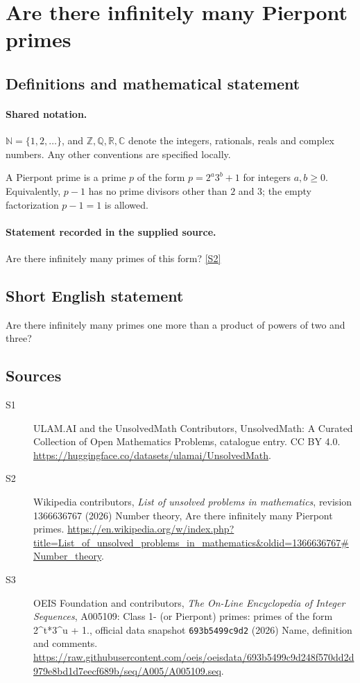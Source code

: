\documentclass[11pt]{article}
\newcommand{\sref}[2]{\hyperlink{source:#1:#2}{[S#2]}}
\begin{document}
\section{Are there infinitely many Pierpont primes}\label{statement}

\subsection{Definitions and mathematical statement}

\paragraph{Shared notation.}$\mathbb N=\{1,2,\ldots\}$, and $\mathbb Z,\mathbb Q,\mathbb R,\mathbb C$ denote the integers, rationals, reals and complex numbers. Any other conventions are specified locally.


A Pierpont prime is a prime $p$ of the form $p=2^a3^b+1$ for integers $a,b\ge0$. Equivalently, $p-1$ has no prime divisors other than $2$ and $3$; the empty factorization $p-1=1$ is allowed.
\paragraph{Statement recorded in the supplied source.}
Are there infinitely many primes of this form? \sref{statement}{2}
\subsection{Short English statement}
Are there infinitely many primes one more than a product of powers of two and three?
\subsection{Sources}
\begin{description}
\item[\hypertarget{source:statement:1}{S1}] ULAM.AI and the UnsolvedMath Contributors, UnsolvedMath: A Curated Collection of Open Mathematics Problems, catalogue entry. CC BY 4.0. \url{https://huggingface.co/datasets/ulamai/UnsolvedMath}.
\item[\hypertarget{source:statement:2}{S2}] Wikipedia contributors, \emph{List of unsolved problems in mathematics}, revision 1366636767 (2026) Number theory, Are there infinitely many Pierpont primes. \url{https://en.wikipedia.org/w/index.php?title=List_of_unsolved_problems_in_mathematics&oldid=1366636767#Number_theory}.
\item[\hypertarget{source:statement:3}{S3}] OEIS Foundation and contributors, \emph{The On-Line Encyclopedia of Integer Sequences}, A005109: Class 1- (or Pierpont) primes: primes of the form 2\textasciicircum{}t*3\textasciicircum{}u + 1., official data snapshot \texttt{693b5499c9d2} (2026) Name, definition and comments. \url{https://raw.githubusercontent.com/oeis/oeisdata/693b5499c9d248f570dd2d979e8bd1d7eecf689b/seq/A005/A005109.seq}.
\end{description}
\label{end:statement}
\end{document}
